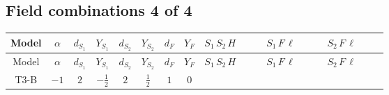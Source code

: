 \documentclass[8pt]{article}
\begin{document}
\begin{landscape}
\subsection*{Field combinations 4 of 4}
\begin{longtable}{@{}cccccccc >{\raggedright\arraybackslash}p{0.21\linewidth} >{\raggedright\arraybackslash}p{0.21\linewidth} >{\raggedright\arraybackslash}p{0.21\linewidth}@{}}
\toprule
Model & $\alpha$ & $d_{S_1}$ & $Y_{S_1}$ & $d_{S_2}$ & $Y_{S_2}$ & $d_F$ & $Y_F$ & $S_1\,S_2\,H$ & $S_1\,F\,\ell$ & $S_2\,F\,\ell$ \\
\midrule
\endfirsthead
\toprule
Model & $\alpha$ & $d_{S_1}$ & $Y_{S_1}$ & $d_{S_2}$ & $Y_{S_2}$ & $d_F$ & $Y_F$ & $S_1\,S_2\,H$ & $S_1\,F\,\ell$ & $S_2\,F\,\ell$ \\
\midrule
\endhead
T3-B & $-1$ & $2$ & $-\frac{1}{2}$ & $2$ & $\frac{1}{2}$ & $1$ & $0$ & \scriptsize\adjustbox{max width=\linewidth}{$\begin{gathered} +\overline{\lambda_5} S_{2,j_2} {\mathcal{I}_{T3}}^{*}_{a_1,a_2,j_1,j_2} H_{a_1}{}^{\dagger } H_{a_2}{}^{\dagger } S_{1,j_1}{}^{\dagger } \\ +H_{a_1} H_{a_2} S_{1,j_2} \mathcal{I}_{T3,a_1,a_2,j_2,j_1} \lambda_5 S_{2,j_1}{}^{\dagger }\end{gathered}$} & \scriptsize\adjustbox{max width=\linewidth}{$\begin{gathered} +\overline{L_{a_1,i_1}}\, P_R\, F_{r_1} S_{1,j_1} y_{1,i_1,r_1} \mathcal{I}_{y_1,a_1,j_1} \\ +\overline{y_{1,i_1,r_1}} F_{r_1}{}^T\, C\, P_L\, L_{a_1,i_1} {\mathcal{I}_{y_1}}^{*}_{a_1,j_1} S_{1,j_1}{}^{\dagger }\end{gathered}$} & \scriptsize\adjustbox{max width=\linewidth}{$\begin{gathered} +\overline{y_{2,i_1,r_1}} F_{r_1}{}^T\, C\, P_L\, L_{a_1,i_1} S_{2,j_1} {\mathcal{I}_{y_2}}^{*}_{a_1,j_1} \\ +\overline{L_{a_1,i_1}}\, P_R\, F_{r_1} y_{2,i_1,r_1} \mathcal{I}_{y_2,a_1,j_1} S_{2,j_1}{}^{\dagger }\end{gathered}$} \\
\midrule

\end{longtable}
\end{landscape}
\end{document}
